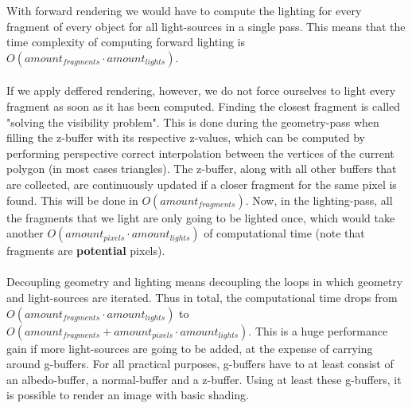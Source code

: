 \documentclass{ACGSeminar}
\begin{document}
		With forward rendering we would have to compute the lighting for every fragment of every object for all light-sources in a single pass. This means that the time complexity of computing forward lighting is $O(amount_{fragments} \cdot amount_{lights})$. \\\\
		If we apply deffered rendering, however, we do not force ourselves to light every fragment as soon as it has been computed. Finding the closest fragment is called "solving the visibility problem". This is done during the geometry-pass when filling the z-buffer with its respective z-values, which can be computed by performing perspective correct interpolation between the vertices of the current polygon (in most cases triangles). The z-buffer, along with all other buffers that are collected, are continuously updated if a closer fragment for the same pixel is found. This will be done in $O(amount_{fragments})$. Now, in the lighting-pass, all the fragments that we light are only going to be lighted once, which would take another $O(amount_{pixels} \cdot amount_{lights})$ of computational time (note that fragments are \textbf{potential} pixels). \\\\
		Decoupling geometry and lighting means decoupling the loops in which geometry and light-sources are iterated. Thus in total, the computational time drops from $O(amount_{fragments} \cdot amount_{lights})$ to $O(amount_{fragments} + amount_{pixels} \cdot amount_{lights})$. This is a huge performance gain if more light-sources are going to be added, at the expense of carrying around g-buffers.
		For all practical purposes, g-buffers have to at least consist of an albedo-buffer, a normal-buffer and a z-buffer. Using at least these g-buffers, it is possible to render an image with basic shading. \\\\
\end{document}
